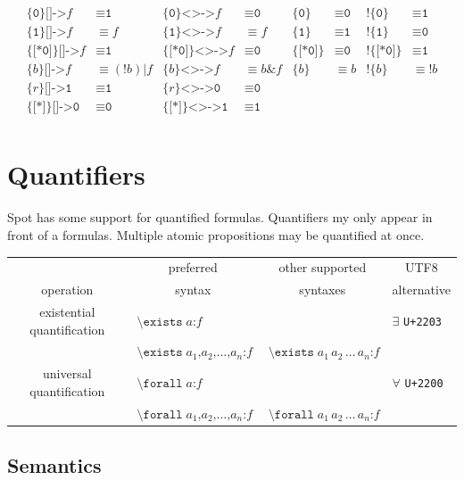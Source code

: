 \documentclass[a4paper,twoside,10pt,DIV=12]{scrreprt}
\newcommand{\uni}[1]{\texttt{\small U+#1}}
\DeclareMathOperator{\NOT}{\texttt{!}}
\newcommand{\OR}{\mathbin{\texttt{|}}}
\newcommand{\AND}{\mathbin{\texttt{\&}}}
\newcommand{\COLON}{\mathbin{\texttt{:}}}
\newcommand{\COMMA}{\mathbin{\texttt{,}}}
\newcommand{\0}{\texttt{0}}
\newcommand{\1}{\texttt{1}}
\newcommand{\STAR}[1]{\texttt{[*#1]}}
\newcommand{\eword}{\texttt{[*0]}}
\DeclareMathOperator{\EXISTS}{\texttt{\textbackslash{}exists}}
\DeclareMathOperator{\FORALL}{\texttt{\textbackslash{}forall}}
\newcommand{\Esuffix}{\texttt{<>->}}
\newcommand{\Asuffix}{\texttt{[]->}}
\newcommand{\sere}[1]{\texttt{\{}#1\texttt{\}}}
\newcommand{\nsere}[1]{\texttt{!\{}#1\texttt{\}}}
\begin{document}
\begin{align*}
  \sere{\0}\Asuffix f &\equiv \1
& \sere{\0}\Esuffix f &\equiv \0
& \sere{\0} & \equiv \0
& \nsere{\0} & \equiv \1 \\
  \sere{\1}\Asuffix f &\equiv f
& \sere{\1}\Esuffix f &\equiv f
& \sere{\1} & \equiv \1
& \nsere{\1} & \equiv \0 \\
  \sere{\eword}\Asuffix f&\equiv \1
& \sere{\eword}\Esuffix f&\equiv \0
& \sere{\eword} & \equiv \0
& \nsere{\eword} & \equiv \1 \\
  \sere{b}\Asuffix f&\equiv (\NOT{b})\OR f
& \sere{b}\Esuffix f&\equiv b\AND f
& \sere{b} &\equiv b
& \nsere{b} &\equiv \NOT b\\
  \sere{r}\Asuffix \1&\equiv \1
& \sere{r}\Esuffix \0&\equiv \0  \\
  \sere{\STAR{}} \Asuffix \0 &\equiv \0
& \sere{\STAR{}} \Esuffix \1 &\equiv \1 \\
\end{align*}

\section{Quantifiers}

Spot has some support for quantified formulas.  Quantifiers my only
appear in front of a formulas.  Multiple atomic propositions may be
quantified at once.

\begin{center}
\begin{tabular}{clll}
              & \multicolumn{1}{c}{preferred} & \multicolumn{1}{c}{other supported} & \multicolumn{1}{c}{UTF8}\\
   operation  & \multicolumn{1}{c}{syntax}    & \multicolumn{1}{c}{syntaxes} & \multicolumn{1}{c}{alternative}\\
  \midrule
   existential quantification & $\EXISTS a \COLON f$ && $\exists$ \uni{2203}\\
              & $\EXISTS a_1\COMMA a_2\COMMA\ldots\COMMA a_n \COLON f$ & $\EXISTS a_1\, a_2\, \ldots\, a_n \COLON f$ \\
  universal quantification & $\FORALL a \COLON f$ && $\forall$ \uni{2200}\\
              & $\FORALL a_1\COMMA a_2\COMMA\ldots\COMMA a_n \COLON f$ & $\FORALL a_1\, a_2\, \ldots\, a_n \COLON f$\\
\end{tabular}
\end{center}

\subsection{Semantics}
\end{document}
